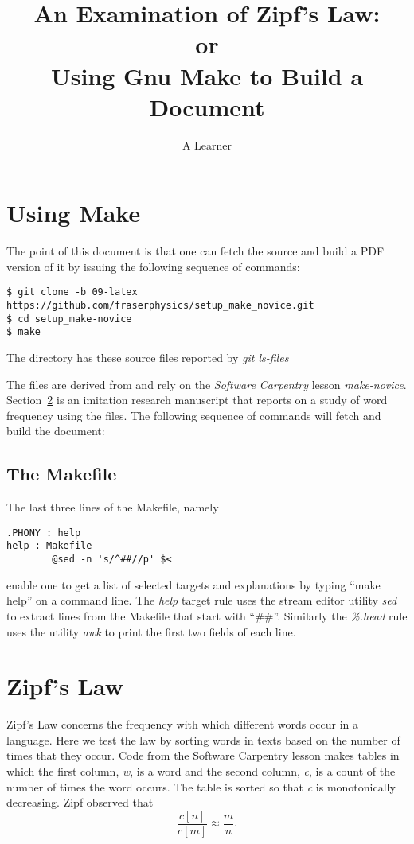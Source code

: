 \documentclass[]{article}
\title{An Examination of Zipf's Law:\\ or\\ Using Gnu Make to Build a
  Document}
\author{A Learner}
\begin{document}
\maketitle

\section{Using Make}
\label{sec:make}

The point of this document is that one can fetch the source and build
a PDF version of it by issuing the following sequence of commands:
\begin{verbatim}
$ git clone -b 09-latex https://github.com/fraserphysics/setup_make_novice.git
$ cd setup_make-novice
$ make
\end{verbatim}

The directory has these source files reported by \emph{git ls-files}
%

%
The files are derived from and rely on the \emph{Software
  Carpentry}\cite{software-carpentry} lesson \emph{make-novice}.
Section~\ref{sec:zipf} is an imitation research manuscript that
reports on a study of word frequency using the files.  The following
sequence of commands will fetch and build the document:

\subsection{The Makefile}
\label{sec:makefile}

The last three lines of the Makefile, namely
\begin{verbatim}
.PHONY : help
help : Makefile
        @sed -n 's/^##//p' $<
\end{verbatim}
enable one to get a list of selected targets and explanations by
typing ``make help'' on a command line.  The \emph{help} target rule
uses the stream editor utility \emph{sed} to extract lines from the
Makefile that start with ``\#\#''.  Similarly the \emph{\%.head} rule
uses the utility \emph{awk} to print the first two fields of each
line.

\section{Zipf's Law}
\label{sec:zipf}

Zipf's Law\cite{Zipf} concerns the frequency with which different
words occur in a language.  Here we test the law by sorting words in
texts based on the number of times that they occur.  Code from the
Software Carpentry lesson makes tables in which the first column,
\emph{w}, is a word and the second column, \emph{c}, is a count of the
number of times the word occurs.  The table is sorted so that \emph{c}
is monotonically decreasing.  Zipf observed that
\begin{equation}
  \frac{c[n]}{c[m]} \approx \frac{m}{n}.
\end{equation}
\end{document}
